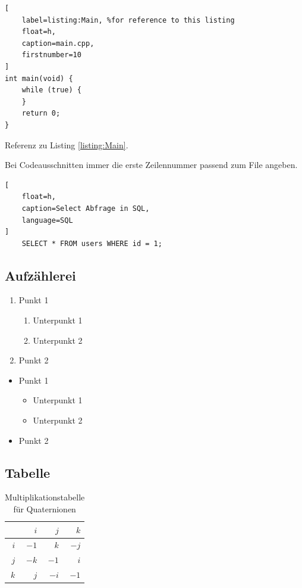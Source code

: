 \begin{lstlisting}[
	label=listing:Main, %for reference to this listing
	float=h,
	caption=main.cpp,
	firstnumber=10
]
int main(void) {
	while (true) {
	}
	return 0;
}
\end{lstlisting}

Referenz zu Listing \ref{listing:Main}.

Bei Codeausschnitten immer die erste Zeilennummer passend zum File angeben.

\begin{lstlisting}[
	float=h,
	caption=Select Abfrage in SQL,
	language=SQL
]
	SELECT * FROM users WHERE id = 1;
\end{lstlisting}


\subsection{Aufzählerei}

\begin{enumerate}
	\item Punkt 1
	\begin{enumerate}
		\item Unterpunkt 1
		\item Unterpunkt 2
	\end{enumerate}
	\item Punkt 2
\end{enumerate}

\begin{itemize}
	\item Punkt 1
	\begin{itemize}
		\item Unterpunkt 1
		\item Unterpunkt 2
	\end{itemize}
	\item Punkt 2
\end{itemize}


\subsection{Tabelle}

\begin{table}[h]
	\centering
	\begin{tabular}{r|rrr}
		    & $i$ & $j$ & $k$ \\ \hline
		$i$ &$-1$ & $k$ &$-j$ \\
		$j$ &$-k$ &$-1$ & $i$ \\
		$k$ & $j$ &$-i$ &$-1$
	\end{tabular}
	\caption{
		Multiplikationstabelle für Quaternionen
	}
	\label{table:Quaternions}
\end{table}

